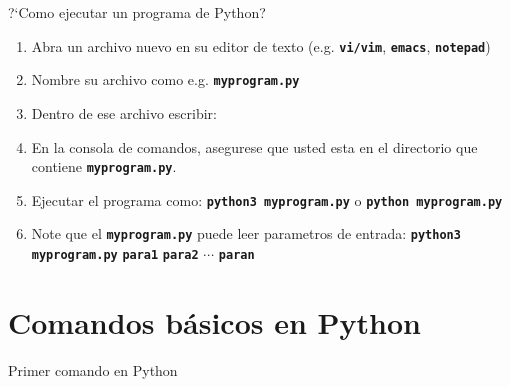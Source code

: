 \documentclass[
10pt,
aspectratio=169,
]{beamer}
\newcommand{\co}[1]{\alert{\textbf{\texttt{#1}}}}
\begin{document}
\begin{frame}[c]{?`Como ejecutar un programa de Python?}
\begin{enumerate}
\item Abra un archivo nuevo en su editor de texto (e.g. \co{vi/vim}, \co{emacs}, \co{notepad})
\item Nombre su archivo como e.g. \co{myprogram.py}
\item Dentro de ese archivo escribir:
\begin{minipage}[t]{\linewidth}
\centering
{}
\end{minipage}
\item En la consola de comandos, asegurese que usted esta en el directorio que contiene \co{myprogram.py}.
\item Ejecutar el programa como: \co{python3 myprogram.py} o \co{python myprogram.py}
\item Note que el \co{myprogram.py} puede leer parametros de entrada: \co{python3 myprogram.py} \co{para1} \co{para2} $\cdots$ \co{paran}

\end{enumerate}
\end{frame}

\section{Comandos b\'asicos en Python}
\begin{frame}[c]{Primer comando en Python}

\end{frame}
\end{document}

